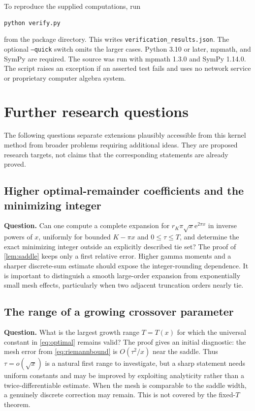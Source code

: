 \documentclass[11pt,a4paper]{article}
\theoremstyle{definition}
\theoremstyle{remark}
\newcommand{\e}{\mathrm e}
\begin{document}
To reproduce the supplied computations, run
\begin{verbatim}
python verify.py
\end{verbatim}
from the package directory. This writes \texttt{verification\_results.json}.
The optional \texttt{--quick} switch omits the larger cases. Python 3.10
or later, mpmath, and SymPy are required. The source was run with mpmath
1.3.0 and SymPy 1.14.0. The script raises an exception if an asserted test
fails and uses no network service or proprietary computer algebra system.

\section{Further research questions}
\label{sec:questions}
The following questions separate extensions plausibly accessible from this
kernel method from broader problems requiring additional ideas. They are
proposed research targets, not claims that the corresponding statements
are already proved.

\subsection{Higher optimal-remainder coefficients and the minimizing integer}
\textbf{Question.} Can one compute a complete expansion for
$r_K\pi\sqrt{x}\e^{2\pi x}$ in inverse powers of $x$, uniformly for bounded
$K-\pi x$ and $0\le\tau\le T$, and determine the exact minimizing integer
outside an explicitly described tie set?
The proof of \cref{lem:saddle} keeps only a first relative error. Higher
gamma moments and a sharper discrete-sum estimate should expose the
integer-rounding dependence. It is important to distinguish a smooth
large-order expansion from exponentially small mesh effects, particularly
when two adjacent truncation orders nearly tie.

\subsection{The range of a growing crossover parameter}
\textbf{Question.} What is the largest growth range $T=T(x)$ for which the
universal constant in \eqref{eq:optimal} remains valid?
The proof gives an initial diagnostic: the mesh error from
\eqref{eq:riemannbound} is $O(\tau^2/x)$ near the saddle. Thus
$\tau=o(\sqrt{x})$ is a natural first range to investigate, but a sharp
statement needs uniform constants and may be improved by exploiting
analyticity rather than a twice-differentiable estimate. When the mesh is
comparable to the saddle width, a genuinely discrete correction may remain.
This is not covered by the fixed-$T$ theorem.
\end{document}
